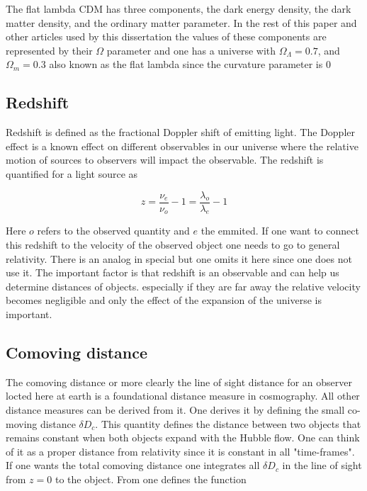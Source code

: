 \documentclass[11pt]{article}
\begin{document}
The flat lambda CDM has three components, the dark energy density, the dark matter density, and the ordinary matter parameter. In the rest of this paper and other articles used by this dissertation the values of these components are represented by their $\Omega$ parameter and one has a universe with $\Omega_\Lambda = 0.7$, and $\Omega_m = 0.3$ also known as the flat lambda since the curvature parameter is $0$


\subsection{Redshift}
Redshift is defined as the fractional Doppler shift of emitting light. The Doppler effect is a known effect on different observables in our universe where the relative motion of sources to observers will impact the observable. The redshift is quantified for a light source as 

\begin{equation}
    z = \frac{\nu_e}{\nu_o}-1 = \frac{\lambda_o}{\lambda_e}-1
\end{equation}

Here $o$ refers to the observed quantity and $e$ the emmited. If one want to connect this redshift to the velocity of the observed object one needs to go to general relativity. There is an analog in special but one omits it here since one does not use it. The important factor is that redshift is an observable and can help us determine distances of objects. especially if they are far away the relative velocity becomes negligible and only the effect of the expansion of the universe is important. 


\subsection{Comoving distance}
The comoving distance or more clearly the line of sight distance for an observer locted here
 at earth is a foundational distance measure in cosmography. All other distance measures can be 
 derived from it. One derives it by defining the small co-moving distance $\delta D_c$. 
 This quantity defines the distance between two objects that remains constant when both objects expand with the Hubble flow.
  One can think of it as a proper distance from relativity since it is constant in all "time-frames". 
  If one wants the total comoving distance one integrates all $\delta D_c$ in the line of sight from $z= 0$ to the object. 
From  \cite{hogg2000distance} one defines the function 
\end{document}
